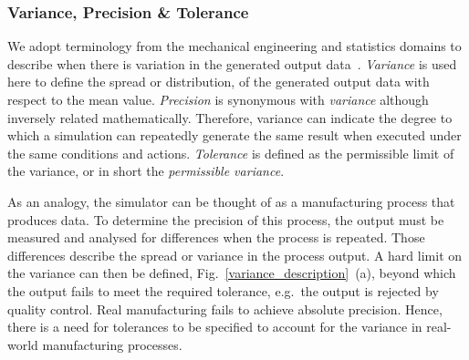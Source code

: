 \documentclass[letterpaper, 10 pt, journal, twoside]{IEEEtran}
\begin{document}
\subsubsection{Variance, Precision \& Tolerance}

We adopt terminology from the mechanical engineering and statistics domains to describe when there is variation in the generated output data~\cite{ADictionaryofMechanicalEngineering}.
%
%
\textit{Variance} is used here to define the spread or distribution, of the generated output data with respect to the mean value. \textit{Precision} is synonymous with \textit{variance} although inversely related mathematically. 
%
Therefore, variance can indicate the degree to which a simulation can repeatedly generate the same result when executed under the same conditions and actions.
%
\textit{Tolerance} is defined as the permissible limit of the variance, or in short the \textit{permissible variance}. 

%
As an analogy, the simulator can be thought of as a manufacturing process that produces data. To determine the precision of this process, the output must be measured and analysed for differences when the process is repeated. 
%
Those differences describe the spread or variance in the process output. A hard limit on the variance can then be defined, Fig.~\ref{variance_description}~(a), beyond which the output fails to meet the required tolerance, e.g.\ the output is rejected by quality control.
%
%
Real manufacturing fails to achieve absolute precision. Hence, there is a need for tolerances to be specified to account for the variance in real-world manufacturing processes. 
\end{document}

